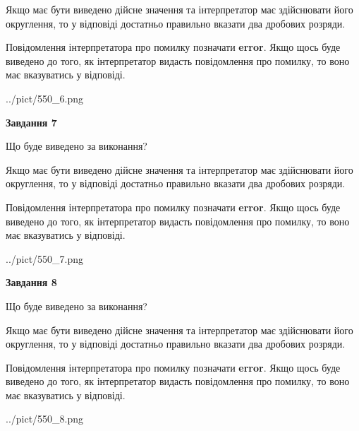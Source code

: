 \documentclass[12pt, ukrainian]{article}
\begin{document}
{\begin {Large}
Якщо має бути виведено дійсне значення та інтерпретатор має здійснювати його округлення, 
то у відповіді достатньо правильно вказати два дробових розряди.

Повідомлення інтерпретатора про помилку позначати \textbf{error}.
Якщо щось буде виведено до того, як інтерпретатор видасть повідомлення про помилку, 
то воно має вказуватись у відповіді. \par

\begin{center}
	{../pict/550_6.png}
\end{center}
\newpage

{\begin {center}\textbf{Завдання 7}\end {center}}\par
Що буде виведено за виконання? \par

Якщо має бути виведено дійсне значення та інтерпретатор має здійснювати його округлення, 
то у відповіді достатньо правильно вказати два дробових розряди.

Повідомлення інтерпретатора про помилку позначати \textbf{error}.
Якщо щось буде виведено до того, як інтерпретатор видасть повідомлення про помилку, 
то воно має вказуватись у відповіді. \par

\begin{center}
	{../pict/550_7.png}
\end{center}
\newpage

{\begin {center}\textbf{Завдання 8}\end {center}}\par
Що буде виведено за виконання? \par

Якщо має бути виведено дійсне значення та інтерпретатор має здійснювати його округлення, 
то у відповіді достатньо правильно вказати два дробових розряди.

Повідомлення інтерпретатора про помилку позначати \textbf{error}.
Якщо щось буде виведено до того, як інтерпретатор видасть повідомлення про помилку, 
то воно має вказуватись у відповіді. \par

\begin{center}
	{../pict/550_8.png}
\end{center}
\newpage


\end{Large}}
\end{document}

